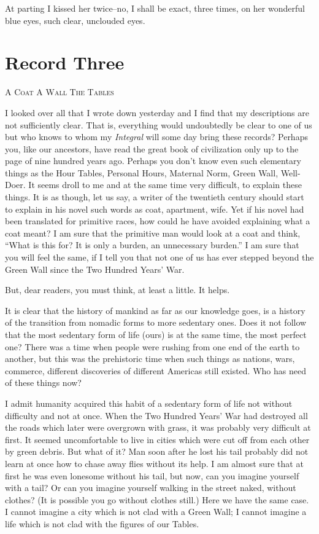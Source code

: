 \documentclass[11pt,openany]{book}
\newcommand{\bookchapterplain}[1]{%
  \clearpage\phantomsection
  \chapter*{#1}%
  \addcontentsline{toc}{chapter}{#1}%
  \markboth{#1}{#1}\thispagestyle{plain}}
\begin{document}
At parting I kissed her twice--no, I shall be exact, three times, on her wonderful blue eyes, such clear, unclouded eyes.

\bookchapterplain{Record Three}

\begin{center}\textsc{A Coat A Wall The Tables}\end{center}

I looked over all that I wrote down yesterday and I find that my descriptions are not sufficiently clear. That is, everything would undoubtedly be clear to one of us but who knows to whom my \emph{Integral} will some day bring these records? Perhaps you, like our ancestors, have read the great book of civilization only up to the page of nine hundred years ago. Perhaps you don't know even such elementary things as the Hour Tables, Personal Hours, Maternal Norm, Green Wall, Well-Doer. It seems droll to me and at the same time very difficult, to explain these things. It is as though, let us say, a writer of the twentieth century should start to explain in his novel such words as coat, apartment, wife. Yet if his novel had been translated for primitive races, how could he have avoided explaining what a coat meant? I am sure that the primitive man would look at a coat and think, ``What is this for? It is only a burden, an unnecessary burden.'' I am sure that you will feel the same, if I tell you that not one of us has ever stepped beyond the Green Wall since the Two Hundred Years' War.

But, dear readers, you must think, at least a little. It helps.

It is clear that the history of mankind as far as our knowledge goes, is a history of the transition from nomadic forms to more sedentary ones. Does it not follow that the most sedentary form of life (ours) is at the same time, the most perfect one? There was a time when people were rushing from one end of the earth to another, but this was the prehistoric time when such things as nations, wars, commerce, different discoveries of different Americas still existed. Who has need of these things now?

I admit humanity acquired this habit of a sedentary form of life not without difficulty and not at once. When the Two Hundred Years' War had destroyed all the roads which later were overgrown with grass, it was probably very difficult at first. It seemed uncomfortable to live in cities which were cut off from each other by green debris. But what of it? Man soon after he lost his tail probably did not learn at once how to chase away flies without its help. I am almost sure that at first he was even lonesome without his tail, but now, can you imagine yourself with a tail? Or can you imagine yourself walking in the street naked, without clothes? (It is possible you go without clothes still.) Here we have the same case. I cannot imagine a city which is not clad with a Green Wall; I cannot imagine a life which is not clad with the figures of our Tables.
\end{document}
